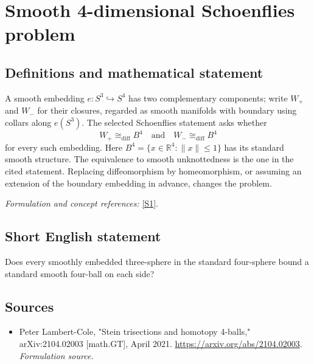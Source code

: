 \documentclass[11pt]{article}
\begin{document}
\section*{\texorpdfstring{Smooth 4-dimensional Schoenflies problem}{Smooth 4-dimensional Schoenflies problem}}\label{statement}
\subsection{Definitions and mathematical statement}
A smooth embedding $e:S^3\hookrightarrow S^4$ has two complementary components; write $W_+$ and $W_-$ for their closures, regarded as smooth manifolds with boundary using collars along $e(S^3)$. The selected Schoenflies statement asks whether
\[
 W_+\cong_{\mathrm{diff}}B^4\quad\text{and}\quad W_-\cong_{\mathrm{diff}}B^4
\]
for every such embedding. Here $B^4=\{x\in{\mathbb{R}}^4:\|x\|\le1\}$ has its standard smooth structure. The equivalence to smooth unknottedness is the one in the cited statement. Replacing diffeomorphism by homeomorphism, or assuming an extension of the boundary embedding in advance, changes the problem.
\par\smallskip\textit{Formulation and concept references:} \href{https://arxiv.org/abs/2104.02003}{[S1]}.

\subsection{Short English statement}
Does every smoothly embedded three-sphere in the standard four-sphere bound a standard smooth four-ball on each side?
\subsection{Sources}
\begin{itemize}
\item[S1]Peter Lambert-Cole, "Stein trisections and homotopy 4-balls," arXiv:2104.02003 [math.GT], April 2021.
\url{https://arxiv.org/abs/2104.02003}.
\textit{Formulation source.}
\end{itemize}
\end{document}
